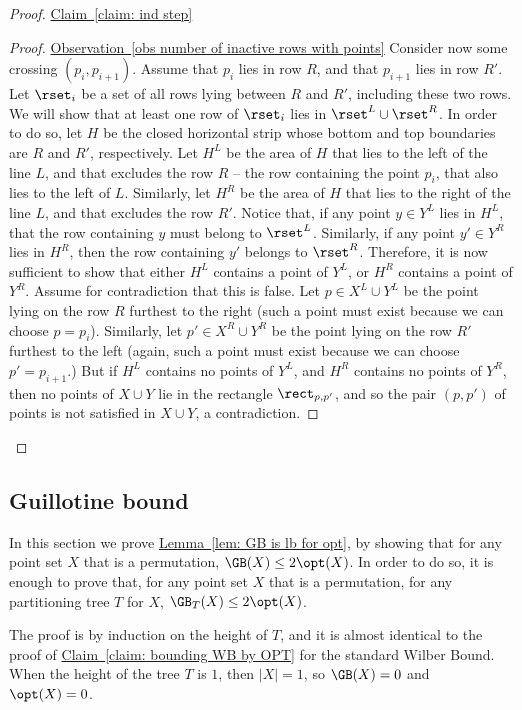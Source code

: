 \documentclass[11pt]{article}
\numberwithin{equation}{section}
\theoremstyle{definition}
\theoremstyle{plain}
\newcommand{\expref}[2]{\hyperref[#2]{#1~\ref{#2}}}
\begin{document}
\begin{proof}{\expref{Claim}{claim: ind step}}
\begin{proof}{\expref{Observation}{obs number of inactive rows with points}}
Consider now some crossing $(p_i,p_{i+1})$. Assume that $p_i$ lies in row $R$, and that $p_{i+1}$ lies in row $R'$. Let $\rset_i$ be a set of all rows lying between $R$ and $R'$, including these two rows. We will show that at least one row of $\rset_i$ lies in $\rset^L\cup \rset^R$. In order to do so, let $H$ be the closed horizontal strip whose bottom and top boundaries are $R$ and $R'$, respectively. Let $H^L$ be the area of $H$ that lies to the left of the line $L$, and that excludes the row $R$ -- the row containing the point $p_i$, that also lies to the left of $L$. Similarly, let $H^R$ be the area of $H$ that lies to the right of the line $L$, and that excludes the row $R'$. Notice that, if any point $y\in Y^L$ lies in $H^L$, that the row containing $y$  must belong to $\rset^L$. Similarly, if any point $y'\in Y^R$ lies in $H^R$, then the row containing $y'$ belongs to $\rset^R$. Therefore, it is now sufficient to show that either $H^L$ contains a point of $Y^L$, or $H^R$ contains a point of $Y^R$. Assume for contradiction that this is false. Let $p\in X^L\cup Y^L$ be the point lying on the row $R$ furthest to the right (such a point must exist because we can choose $p=p_i$). Similarly, let $p'\in X^R\cup Y^R$ be the point lying on the row $R'$ furthest to the left (again, such a point must exist because we can choose $p'=p_{i+1}$.) But if $H^L$ contains no points of $Y^L$, and $H^R$ contains no points of $Y^R$, then no points of $X\cup Y$ lie in the rectangle $\rect_{p,p'}$, and so the pair $(p,p')$ of points is not satisfied in $X\cup Y$, a contradiction.
\end{proof}	
\end{proof}

\subsection{Guillotine bound}
\label{sec: GB proof} 

In this section we prove \expref{Lemma}{lem: GB is lb for opt}, by showing that for any point set $X$ that is a permutation, $\GB(X)\leq 2\opt(X)$. In order to do so, it is enough to prove that, for any point set $X$ that is a permutation, for any partitioning tree $T$ for $X$, $\GB_T(X) \leq 2\opt(X)$. 

The proof is by induction on the height of $T$, and it is almost identical to the proof of \expref{Claim}{claim: bounding WB by OPT} for the standard Wilber Bound. When the height of the tree $T$ is $1$, then $|X|=1$, so $\GB(X)=0$ and $\opt(X)=0$.
\end{document}
